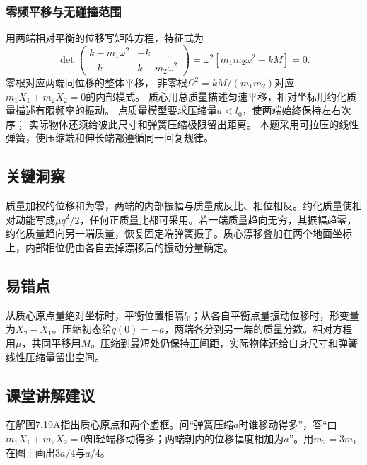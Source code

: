 \documentclass[UTF8,fontset=fandol,a4paper,11pt]{ctexart}
\begin{document}
\subsubsection*{零频平移与无碰撞范围}
用两端相对平衡的位移写矩阵方程，特征式为
\[
\det\begin{pmatrix}k-m_1\omega^2&-k\\-k&k-m_2\omega^2\end{pmatrix}
=\omega^2[m_1m_2\omega^2-kM]=0.
\]
零根对应两端同位移的整体平移，
非零根$\Omega^2=kM/(m_1m_2)$对应$m_1X_1+m_2X_2=0$的内部模式。
质心用总质量描述匀速平移，相对坐标用约化质量描述有限频率的振动。
点质量模型要求压缩量$a<l_0$，使两端始终保持左右次序；
实际物体还须给彼此尺寸和弹簧压缩极限留出距离。
本题采用可拉压的线性弹簧，使压缩端和伸长端都遵循同一回复规律。




\subsection*{关键洞察}

质量加权的位移和为零，两端的内部振幅与质量成反比、相位相反。约化质量使相对动能写成$\mu\dot q^2/2$，任何正质量比都可采用。若一端质量趋向无穷，其振幅趋零，约化质量趋向另一端质量，恢复固定端弹簧振子。质心漂移叠加在两个地面坐标上，内部相位仍由各自去掉漂移后的振动分量确定。




\subsection*{易错点}

从质心原点量绝对坐标时，平衡位置相隔$l_0$；从各自平衡点量振动位移时，形变量为$X_2-X_1$。压缩初态给$q(0)=-a$，两端各分到另一端的质量分数。相对方程用$\mu$，共同平移用$M$。压缩到最短处仍保持正间距，实际物体还给自身尺寸和弹簧线性压缩量留出空间。




\subsection*{课堂讲解建议}

在解图7.19A指出质心原点和两个虚框。问“弹簧压缩$a$时谁移动得多”，答“由$m_1X_1+m_2X_2=0$知轻端移动得多；两端朝内的位移幅度相加为$a$”。用$m_2=3m_1$在图上画出$3a/4$与$a/4$。
\end{document}
